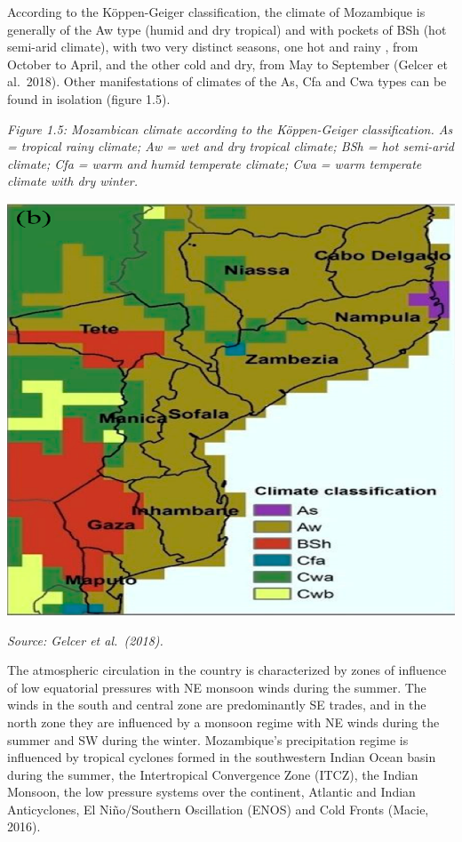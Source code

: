 \documentclass[
]{book}
\begin{document}
According to the Köppen-Geiger classification, the climate of Mozambique is generally of the Aw type (humid and dry tropical) and with pockets of BSh (hot semi-arid climate), with two very distinct seasons, one hot and rainy , from October to April, and the other cold and dry, from May to September (Gelcer et al.~2018). Other manifestations of climates of the As, Cfa and Cwa types can be found in isolation (figure 1.5).

\emph{Figure 1.5: Mozambican climate according to the Köppen-Geiger classification. As = tropical rainy climate; Aw = wet and dry tropical climate; BSh = hot semi-arid climate; Cfa = warm and humid temperate climate; Cwa = warm temperate climate with dry winter.}

\includegraphics{Figure11.png}

\emph{Source: Gelcer et al.~(2018).}

The atmospheric circulation in the country is characterized by zones of influence of low equatorial pressures with NE monsoon winds during the summer. The winds in the south and central zone are predominantly SE trades, and in the north zone they are influenced by a monsoon regime with NE winds during the summer and SW during the winter. Mozambique's precipitation regime is influenced by tropical cyclones formed in the southwestern Indian Ocean basin during the summer, the Intertropical Convergence Zone (ITCZ), the Indian Monsoon, the low pressure systems over the continent, Atlantic and Indian Anticyclones, El Niño/Southern Oscillation (ENOS) and Cold Fronts (Macie, 2016).
\end{document}

